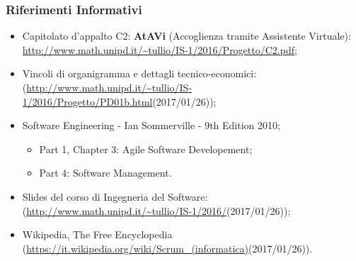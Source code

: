\documentclass[../ManualeUtente_v2.0.0.tex]{subfiles}
\begin{document}
		\subsubsection{Riferimenti Informativi}
		\begin{itemize}
			\item Capitolato d'appalto C2: \textbf{AtAVi} (Accoglienza tramite Assistente Virtuale):\\ \url{http://www.math.unipd.it/~tullio/IS-1/2016/Progetto/C2.pdf};
			\item Vincoli di organigramma e dettagli tecnico-economici:\\
			(\url{http://www.math.unipd.it/~tullio/IS-1/2016/Progetto/PD01b.html}(2017/01/26));
			\item Software Engineering - Ian Sommerville - 9th Edition 2010;
			\begin{itemize}
				\item Part 1, Chapter 3: Agile Software Developement;
				\item Part 4: Software Management.
			\end{itemize}
			\item Slides del corso di Ingegneria del Software:\\
			(\url{http://www.math.unipd.it/~tullio/IS-1/2016/}(2017/01/26));
			\item Wikipedia, The Free Encyclopedia\\
			(\url{https://it.wikipedia.org/wiki/Scrum_(informatica)}(2017/01/26)).
		\end{itemize}
\end{document}
